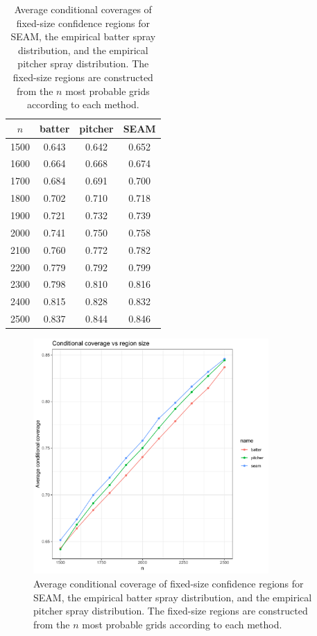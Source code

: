 \documentclass[12pt]{article}
\begin{document}
\begin{table}
\begin{center}
\begin{tabular}{c|ccc}
$n$ & batter & pitcher & SEAM\\
\hline
1500 & 0.643 & 0.642 & 0.652\\
1600 & 0.664 & 0.668 & 0.674\\
1700 & 0.684 & 0.691 & 0.700\\
1800 & 0.702 & 0.710 & 0.718\\
1900 & 0.721 & 0.732 & 0.739\\
2000 & 0.741 & 0.750 & 0.758\\
2100 & 0.760 & 0.772 & 0.782\\
2200 & 0.779 & 0.792 & 0.799\\
2300 & 0.798 & 0.810 & 0.816\\
2400 & 0.815 & 0.828 & 0.832\\
2500 & 0.837 & 0.844 & 0.846
\end{tabular}
\end{center}
\caption{Average conditional coverages of fixed-size confidence regions for SEAM, the empirical batter spray distribution, and the empirical pitcher spray distribution. The fixed-size regions are constructed from the $n$ most probable grids according to each method.}
\label{Tab:fixed-size}
\end{table}


\begin{figure}[t!]
\begin{center}
\includegraphics[width=0.80\textwidth]{coverage_size.pdf}	
\end{center}	
\caption{Average conditional coverage of fixed-size confidence regions for SEAM, the empirical batter spray distribution, and the empirical pitcher spray distribution. The fixed-size regions are constructed from the $n$ most probable grids according to each method. }
\label{Fig:fixed-size}
\end{figure}
\end{document}
